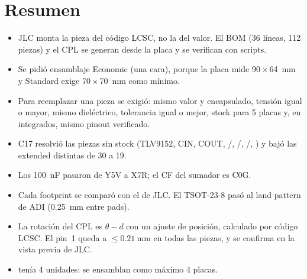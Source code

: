 \section*{Resumen}
\begin{itemize}
  \item JLC monta la pieza del código LCSC, no la del valor. El BOM (36 líneas, 112 piezas) y el CPL se generan desde la placa y se verifican con scripts.
  \item Se pidió ensamblaje Economic (una cara), porque la placa mide \num{90}\,$\times$\,\SI{64}{\milli\meter} y Standard exige \num{70}\,$\times$\,\SI{70}{\milli\meter} como mínimo.
  \item Para reemplazar una pieza se exigió: mismo valor y encapsulado, tensión igual o mayor, mismo dieléctrico, tolerancia igual o mejor, stock para 5 placas y, en integrados, mismo pinout verificado.
  \item C17 resolvió las piezas sin stock (TLV9152, CIN, COUT, /, /, /, ) y bajó las extended distintas de 30 a 19.
  \item Los \SI{100}{\nano\farad} pasaron de Y5V a X7R; el CF del sumador es C0G.
  \item Cada footprint se comparó con el de JLC. El TSOT-23-8 pasó al land pattern de ADI (\SI{0.25}{\milli\meter} entre pads).
  \item La rotación del CPL es $\theta-d$ con un ajuste de posición, calculado por código LCSC. El pin~1 queda a $\le\SI{0.21}{\milli\meter}$ en todas las piezas, y se confirma en la vista previa de JLC.
  \item {} tenía 4 unidades: se ensamblan como máximo 4 placas.
\end{itemize}
